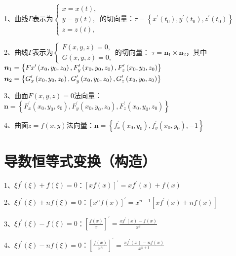 1、曲线$ \Gamma $表示为$ \left\{\begin{array}{l}x=x(t), \\ y=y(t),  \\ z=z(t),\end{array}\right. $的切向量：$ \tau=\left\{x^{\prime}\left(t_{0}\right), y^{\prime}\left(t_{0}\right), z^{\prime}\left(t_{0}\right)\right\} $

2、曲线$ \Gamma $表示为$ \left\{\begin{array}{l}F(x, y, z)=0,\\ G(x, y, z)=0,\end{array}\right. $的切向量： $ \tau=\boldsymbol{n}_{1} \times \boldsymbol{n}_{2} $，其中$ \newline\begin{aligned} &\boldsymbol{n}_{1}=\left\{F{x}^{\prime}\left(x_{0}, y_{0}, z_{0}\right), F_{y}^{\prime}\left(x_{0}, y_{0}, z_{0}\right), F_{z}^{\prime}\left(x_{0}, y_{0}, z_{0}\right)\right\} \\ &\boldsymbol{n}_{2}=\left\{G_{x}^{\prime}\left(x_{0}, y_{0}, z_{0}\right), G_{y}^{\prime}\left(x_{0}, y_{0}, z_{0}\right), G_{z}^{\prime}\left(x_{0}, y_{0}, z_{0}\right)\right\} \end{aligned} $

3、曲面$ F(x, y, z)=0 $法向量：$ \boldsymbol{n}=\left\{F_{x}^{\prime}\left(x_{0}, y_{0}, z_{0}\right), F_{y}^{\prime}\left(x_{0}, y_{0}, z_{0}\right), F_{z}^{\prime}\left(x_{0}, y_{0}, z_{0}\right)\right\} $

4、曲面$ z=f(x, y) $法向量：$ \boldsymbol{n}=\left\{f_{x}^{\prime}\left(x_{0}, y_{0}\right),f_{y}^{\prime}\left(x_{0}, y_{0}\right),-1\right\} $

\section{导数恒等式变换（构造）}

1、$ \xi f^{\prime}(\xi)+f(\xi)=0 $：$ [x f(x)]^{\prime}=x f^{\prime}(x)+f(x) $

2、$ \xi f^{\prime}(\xi)+n f(\xi)=0 $：$ \left[x^{n} f(x)\right]^{\prime}=x^{n-1}\left[x f^{\prime}(x)+n f(x)\right] $

3、$ \xi f^{\prime}(\xi)-f(\xi)=0 $：$ \left[\frac{f(x)}{x}\right]^{\prime}=\frac{x f^{\prime}(x)-f(x)}{x^{2}} $

4、$ \xi f^{\prime}(\xi)-n f(\xi)=0 $：$ \left[\frac{f(x)}{x^{n}}\right]^{\prime}=\frac{x f^{\prime}(x)-n f(x)}{x^{n+1}} $

